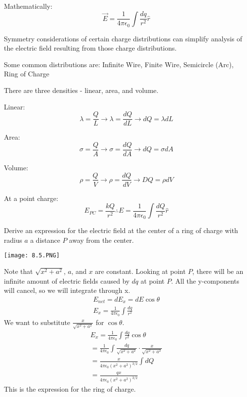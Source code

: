 \documentclass[../em.tex]{subfiles}
\begin{document}
Mathematically:
\[\vec{E}=\frac{1}{4\pi\epsilon_0}\int\frac{dq}{r^2}\hat{r}\]

Symmetry considerations of certain charge distributions can simplify analysis of the electric field resulting from those charge distributions.

Some common distributions are: Infinite Wire, Finite Wire, Semicircle (Arc), Ring of Charge 

There are three densities - linear, area, and volume. 

Linear: 
\[\lambda=\frac{Q}{L}\longrightarrow \lambda = \frac{dQ}{dL} \longrightarrow dQ=\lambda dL\]

Area: 
\[\sigma=\frac{Q}{A}\longrightarrow \sigma = \frac{dQ}{dA}\longrightarrow dQ=\sigma dA\]

Volume: 
\[\rho = \frac{Q}{V}\longrightarrow \rho = \frac{dQ}{dV} \longrightarrow DQ=\rho dV\]

At a point charge:
\[E_{PC}=\frac{kQ}{r^2} \therefore E=\frac{1}{4\pi\epsilon_0}\int \frac{dQ}{r^2}\hat{r}\]

\begin{example}
    Derive an expression for the electric field at the center of a ring of charge with radius $a$ a distance $P$ away from the center.
    \begin{center}
        \texttt{[image: 8.5.PNG]}
    \end{center}
    Note that $\sqrt{x^2+a^2}$, $a$, and $x$ are constant. 
    \smallbreak
    Looking at point $P$, there will be an infinite amount of electric fields caused by $dq$ at point $P$.
    \smallbreak
    All the y-components will cancel, so we will integrate through x.
    \begin{align*}
        E_{net}=dE_x=dE\cos\theta
        \\
        E_x=\frac{1}{4\pi\epsilon_0}\int\frac{dq}{r^2}
    \end{align*}
    We want to substitute $\frac{x}{\sqrt{x^2+a^2}}$ for $\cos\theta$.
    \begin{align*}
        E_x=\frac{1}{4\pi\epsilon_0}\int\frac{dq}{r^2}\cos\theta
        \\
        =\frac{1}{4\pi\epsilon_0}\int\frac{dq}{\sqrt{x^2+a^2}}\cdot\frac{x}{\sqrt{x^2+a^2}}
        \\
        =\frac{x}{4\pi\epsilon_0(x^2+a^2)^{3/2}}\int{dQ}
        \\
        =\frac{qx}{4\pi\epsilon_0(x^2+a^2)^{3/2}}
    \end{align*}
    This is the expression for the ring of charge. 
\end{example}
\end{document}
